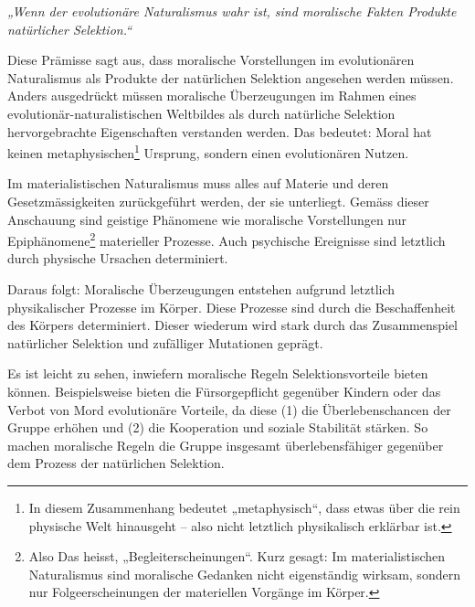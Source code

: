 \documentclass[11pt,a4paper]{article}
\begin{document}
	\textit{„Wenn der evolutionäre Naturalismus wahr ist, sind moralische Fakten Produkte natürlicher Selektion.“}
	
	Diese Prämisse sagt aus, dass moralische Vorstellungen im evolutionären Naturalismus als Produkte der natürlichen Selektion angesehen werden müssen. Anders ausgedrückt müssen moralische Überzeugungen im Rahmen eines evolutionär-naturalistischen Weltbildes als durch natürliche Selektion hervorgebrachte Eigenschaften verstanden werden. Das bedeutet: Moral hat keinen metaphysischen\footnote{In diesem Zusammenhang bedeutet „metaphysisch“, dass etwas über die rein physische Welt hinausgeht – also nicht letztlich physikalisch erklärbar ist.} Ursprung, sondern einen evolutionären Nutzen.
	
	Im materialistischen Naturalismus muss alles auf Materie und deren Gesetzmässigkeiten zurückgeführt werden, der sie unterliegt. Gemäss dieser Anschauung sind geistige Phänomene wie moralische Vorstellungen nur Epiphänomene\footnote{  Also Das heisst, „Begleiterscheinungen“. Kurz gesagt: Im materialistischen Naturalismus sind moralische Gedanken nicht eigenständig wirksam, sondern nur Folgeerscheinungen der materiellen Vorgänge im Körper.} materieller Prozesse. Auch psychische Ereignisse sind letztlich durch physische Ursachen determiniert.
	
	Daraus folgt: Moralische Überzeugungen entstehen aufgrund letztlich physikalischer Prozesse im Körper. Diese Prozesse sind durch die Beschaffenheit des Körpers determiniert. Dieser wiederum wird stark durch das Zusammenspiel natürlicher Selektion und zufälliger Mutationen geprägt.
	
	Es ist leicht zu sehen, inwiefern moralische Regeln Selektionsvorteile bieten können. Beispielsweise bieten die Fürsorgepflicht gegenüber Kindern oder das Verbot von Mord evolutionäre Vorteile, da diese (1) die Überlebenschancen der Gruppe erhöhen und (2) die Kooperation und soziale Stabilität stärken. So machen moralische Regeln die Gruppe insgesamt überlebensfähiger gegenüber dem Prozess der natürlichen Selektion.
	
%	
%	
	
\end{document}
